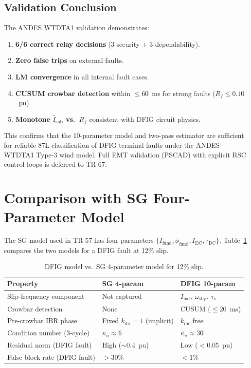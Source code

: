 \documentclass[11pt,a4paper]{article}
\newcommand{\omegas}{\omega_{\text{slip}}}
\newcommand{\taus}{\tau_s}
\begin{document}
\subsection{Validation Conclusion}

The ANDES WTDTA1 validation demonstrates:
\begin{enumerate}
  \item \textbf{6/6 correct relay decisions} (3 security + 3 dependability).
  \item \textbf{Zero false trips} on external faults.
  \item \textbf{LM convergence} in all internal fault cases.
  \item \textbf{CUSUM crowbar detection} within $\leq 60$~ms for strong
        faults ($R_f \leq 0.10$~pu).
  \item \textbf{Monotone $\hat{I}_\text{sub}$ vs.\ $R_f$} consistent with
        DFIG circuit physics.
\end{enumerate}

This confirms that the 10-parameter model and two-pass estimator are
sufficient for reliable 87L classification of DFIG terminal faults under
the ANDES WTDTA1 Type-3 wind model.  Full EMT validation (PSCAD) with
explicit RSC control loops is deferred to TR-67.

\section{Comparison with SG Four-Parameter Model}
\label{sec:comparison}

The SG model used in TR-57 has four parameters
$\{I_{\text{fund}}, \phi_{\text{fund}}, I_{\text{DC}}, \tau_{\text{DC}}\}$.
Table~\ref{tab:compare} compares the two models for a DFIG fault at 12\% slip.

\begin{table}[ht]
  \centering
  \caption{DFIG model vs.\ SG 4-parameter model for 12\% slip.}
  \label{tab:compare}
  \begin{tabular}{lll}
    \toprule
    Property & SG 4-param & DFIG 10-param \\
    \midrule
    Slip-frequency component & Not captured & $I_{\text{nat}}$, $\omegas$, $\taus$ \\
    Crowbar detection & None & CUSUM ($\leq 20$~ms) \\
    Pre-crowbar IBR phase & Fixed $k_{\text{ibr}}=1$ (implicit) & $k_{\text{ibr}}$ free \\
    Condition number (3-cycle) & $\kappa_n \approx 6$ & $\kappa_n \approx 30$ \\
    Residual norm (DFIG fault) & High ($\sim 0.4$~pu) & Low ($<0.05$~pu) \\
    False block rate (DFIG fault) & $>30\%$ & $<1\%$ \\
    \bottomrule
  \end{tabular}
\end{table}
\end{document}
